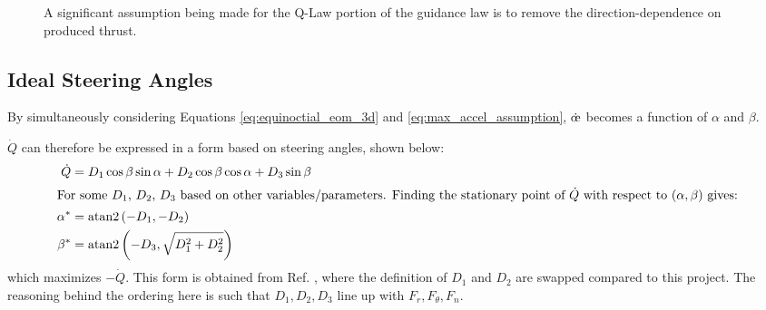 \begin{figure}
  \centering
  \caption{A significant assumption being made for the Q-Law portion of the guidance law is to remove the direction-dependence on produced thrust.}
  \label{fig:thrust_curve}
\end{figure}

\subsection{Ideal Steering Angles}
By simultaneously considering Equations \ref{eq:equinoctial_eom_3d} and \ref{eq:max_accel_assumption}, \(\dot{\moe}\) becomes a function of \(\alpha\) and \(\beta\).

\(\dot{Q}\) can therefore be expressed in a form based on steering angles, shown below:
\begin{align}
  \dot{Q}  & = D_1 \cos \beta \sin \alpha + D_2 \cos \beta \cos \alpha + D_3 \sin \beta \label{eq:q_dot_angles_form} \\
  \intertext{For some \(D_1\), \(D_2\), \(D_3\) based on other variables/parameters. Finding the stationary point of \(\dot{Q}\) with respect to \((\alpha, \beta)\) gives:}
  \alpha^* & = \mathrm{atan2}\left(-D_1, -D_2\right) \label{eq:alpha_star}                                           \\
  \beta^*  & = \mathrm{atan2}\left(-D_3, \sqrt{D_1^2 + D_2^2}\right) \label{eq:beta_star}
\end{align}
which maximizes \(-\dot{Q}\). This form is obtained from Ref. \cite{vargaperez2016}, where the definition of \(D_1\) and \(D_2\) are swapped compared to this project. The reasoning behind the ordering here is such that \(D_1, D_2, D_3\) line up with \(F_r, F_\theta, F_n\).

